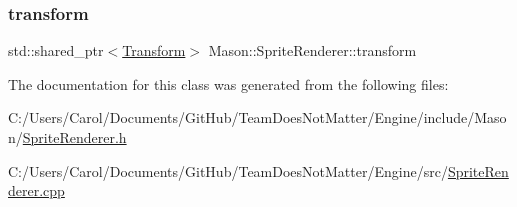 \subsubsection{\texorpdfstring{transform}{transform}}
{\footnotesize\ttfamily std\+::shared\+\_\+ptr$<$\hyperlink{class_mason_1_1_transform}{Transform}$>$ Mason\+::\+Sprite\+Renderer\+::transform\hspace{0.3cm}{\ttfamily [protected]}}



The documentation for this class was generated from the following files\+:\begin{DoxyCompactItemize}
\item 
C\+:/\+Users/\+Carol/\+Documents/\+Git\+Hub/\+Team\+Does\+Not\+Matter/\+Engine/include/\+Mason/\hyperlink{_sprite_renderer_8h}{Sprite\+Renderer.\+h}\item 
C\+:/\+Users/\+Carol/\+Documents/\+Git\+Hub/\+Team\+Does\+Not\+Matter/\+Engine/src/\hyperlink{_sprite_renderer_8cpp}{Sprite\+Renderer.\+cpp}\end{DoxyCompactItemize}
